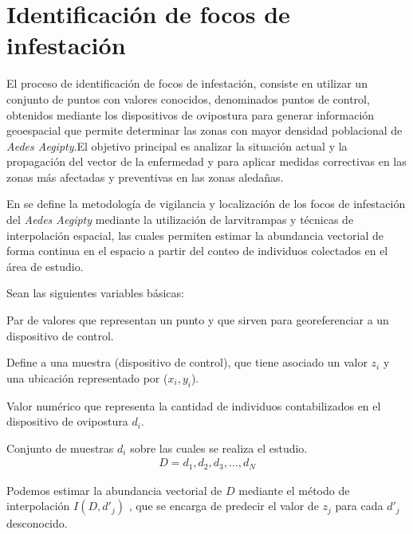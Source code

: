 \section{Identificación de focos de infestación}

El proceso de identificación de focos de infestación, consiste en utilizar un conjunto de puntos con valores
conocidos, denominados puntos de control, obtenidos mediante los dispositivos  de ovipostura para generar
información geoespacial que permite determinar las zonas con mayor densidad poblacional de \textit{Aedes Aegipty}.El
objetivo principal es analizar la situación actual y la propagación del vector de la enfermedad y para aplicar
medidas correctivas en las zonas más afectadas y preventivas en las zonas aledañas.

En \cite{NINO2011} se define la metodología de vigilancia y localización de los focos de infestación del 
\textit{Aedes Aegipty} mediante la utilización de larvitrampas y técnicas de interpolación espacial, las 
cuales permiten estimar la abundancia vectorial de forma continua en el espacio a partir del conteo de individuos
colectados en el área de estudio. 

Sean las siguientes variables básicas:
\begin{description}[style=multiline,leftmargin=1.5cm]

    \item[($x_{i},y_{i}$)]  Par de valores que representan un punto y que sirven para
        georeferenciar a un dispositivo de control.  

    \item[$d_{i}$]  Define a una muestra (dispositivo de control), que tiene asociado un
    valor $z_{i}$ y una ubicación representado por ($x_{i},y_{i}$).

    \item[$z_{i}$]  Valor numérico que representa la cantidad de individuos contabilizados
    en el dispositivo de ovipostura $d_{i}$.

    \item[$D$]  Conjunto de muestras $d_{i}$ sobre las cuales se realiza el estudio.
        \begin{align*}
            D = d_1,d_2,d_3,\ldots,d_N
        \end{align*}
        
\end{description}

Podemos estimar la abundancia vectorial de $D$ mediante el método de interpolación $I(D, d'_j)$ 
, que se encarga de predecir el valor de $z_j$ para cada $d'_j$ desconocido.
